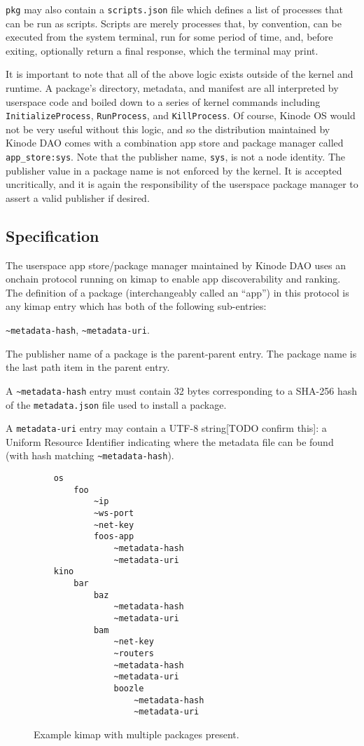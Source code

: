 \documentclass[runningheads]{llncs}
\begin{document}
\verb|pkg| may also contain a \verb|scripts.json| file which defines a list of processes that can be run as scripts.
Scripts are merely processes that, by convention, can be executed from the system terminal, run for some period of time, and, before exiting, optionally return a final response, which the terminal may print.

It is important to note that all of the above logic exists outside of the kernel and runtime.
A package's directory, metadata, and manifest are all interpreted by userspace code and boiled down to a series of kernel commands including \verb|InitializeProcess|, \verb|RunProcess|, and \verb|KillProcess|.
Of course, Kinode OS would not be very useful without this logic, and so the distribution maintained by Kinode DAO comes with a combination app store and package manager called \verb|app_store:sys|.
Note that the publisher name, \verb|sys|, is not a node identity.
The publisher value in a package name is not enforced by the kernel.
It is accepted uncritically, and it is again the responsibility of the userspace package manager to assert a valid publisher if desired.

\subsection{Specification}
\label{sec:packagemanagerspec}

The userspace app store/package manager maintained by Kinode DAO uses an onchain protocol running on kimap to enable app discoverability and ranking.
The definition of a package (interchangeably called an ``app'') in this protocol is any kimap entry which has both of the following sub-entries:

\verb|~metadata-hash|, \verb|~metadata-uri|.

The publisher name of a package is the parent-parent entry.
The package name is the last path item in the parent entry.

A \verb|~metadata-hash| entry must contain 32 bytes corresponding to a SHA-256 hash of the \verb|metadata.json| file used to install a package.

A \verb|metadata-uri| entry may contain a UTF-8 string[TODO confirm this]: a Uniform Resource Identifier indicating where the metadata file can be found (with hash matching \verb|~metadata-hash|).

\begin{figure}[H]
    \centering
    \begin{lstlisting}
    os
        foo
            ~ip
            ~ws-port
            ~net-key
            foos-app
                ~metadata-hash
                ~metadata-uri
    kino
        bar
            baz
                ~metadata-hash
                ~metadata-uri
            bam
                ~net-key
                ~routers
                ~metadata-hash
                ~metadata-uri
                boozle
                    ~metadata-hash
                    ~metadata-uri
    \end{lstlisting}
    \caption{Example kimap with multiple packages present.}
    \label{fig:example kimap with packages}
\end{figure}
\end{document}
